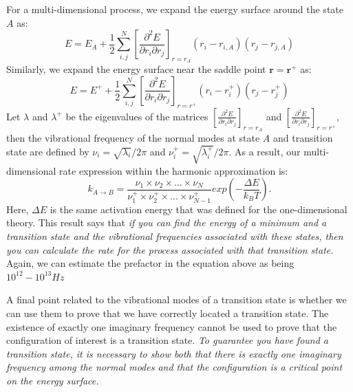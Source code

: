 \documentclass[12pt]{article}
\begin{document}
For a multi-dimensional process, we expand the energy surface around the state $A$ as:
\begin{equation}
    E = E_A + \frac{1}{2}\sum_{i,j}^N[\frac{\partial^2 E}{\partial r_i \partial r_j}]_{r=r_A}(r_i - r_{i,A})(r_j - r_{j,A})
\end{equation}
Similarly, we expand the energy surface near the saddle point $\boldsymbol{r}=\boldsymbol{r^+}$ as:
\begin{equation}
    E = E^+ + \frac{1}{2}\sum_{i,j}^N[\frac{\partial^2 E}{\partial r_i \partial r_j}]_{r=r^+}(r_i - r_{i}^+)(r_j - r_{j}^+)
\end{equation}
Let $\lambda$ and $\lambda^+$ be the eigenvalues of the matrices $[\frac{\partial^2 E}{\partial r_i \partial r_j}]_{r=r_A}$ and $[\frac{\partial^2 E}{\partial r_i \partial r_j}]_{r=r^+}$, then the vibrational frequency of the normal modes at state $A$ and transition state are defined by $\nu_i=\sqrt{\lambda_i}/2\pi$ and $\nu_i^+=\sqrt{\lambda_i^+}/2\pi$. As a result, our multi-dimensional rate expression within the harmonic approximation is:
\begin{equation}
    k_{A\rightarrow B} = \frac{\nu_1\times\nu_2\times...\times \nu_N}{\nu_1^+\times\nu_2^+\times...\times \nu_{N-1}^+}exp(-\frac{\Delta E}{k_BT}).
\end{equation}
Here, $\Delta E$ is the same activation energy that was defined for the one-dimensional theory. This result says that \textit{if you can find the energy of a minimum and a transition state and the vibrational frequencies associated with these states, then you can calculate the rate for the process associated with that transition state.} Again, we can estimate the prefactor in the equation above as being $10^{12}-10^{13}Hz$

A final point related to the vibrational modes of a transition state is whether we can use them to prove that we have correctly located a transition state. The existence of exactly one imaginary frequency cannot be used to prove that the configuration of interest is a transition state. \emph{To guarantee you have found a transition state, it is necessary to show both that there is exactly one imaginary frequency among the normal modes and that the configuration is a critical point on the energy surface.}
\end{document}
